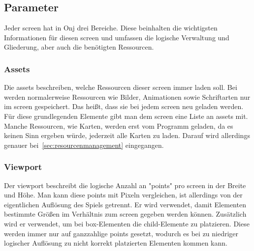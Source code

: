 \renewcommand{\kapitelautor}{Autor: Felix Zwickelstorfer}
\subsection{Parameter}\label{subsec:parameter}
\renewcommand{\kapitelautor}{Autor: Felix Zwickelstorfer}

Jeder screen hat in Onj drei Bereiche.
Diese beinhalten die wichtigsten Informationen für diesen screen und umfassen die logische Verwaltung und Gliederung, aber auch die benötigten Ressourcen.

\renewcommand{\kapitelautor}{Autor: Felix Zwickelstorfer}
\subsubsection{Assets}\label{subsubsec:assets}
\renewcommand{\kapitelautor}{Autor: Felix Zwickelstorfer}
Die assets beschreiben, welche Ressourcen dieser screen immer laden soll. 
Bei \FF werden normalerweise Ressourcen wie Bilder, Animationen sowie Schriftarten nur im screen gespeichert. 
Das heißt, dass sie bei jedem screen neu geladen werden. 
Für diese grundlegenden Elemente gibt man dem screen eine Liste an assets mit.
Manche Ressourcen, wie \zB Karten, werden erst vom Programm geladen, da es keinen Sinn ergeben würde, jederzeit alle Karten zu laden. 
Darauf wird allerdings genauer bei~\ref{sec:resourcenmanagement} eingegangen.

\renewcommand{\kapitelautor}{Autor: Felix Zwickelstorfer}
\subsubsection{Viewport}\label{subsubsec:viewport}
\renewcommand{\kapitelautor}{Autor: Felix Zwickelstorfer}
Der viewport beschreibt die logische Anzahl an "points" pro screen in der Breite und Höhe. 
Man kann diese points mit Pixeln vergleichen, ist allerdings von der eigentlichen Auflösung des Spiels getrennt.
Er wird verwendet, damit Elementen bestimmte Größen im Verhältnis zum screen gegeben werden können.
Zusätzlich wird er verwendet, um bei box-Elementen die child-Elemente zu platzieren.
Diese werden immer nur auf ganzzahlige points gesetzt, wodurch es bei zu niedriger logischer Auflösung zu nicht korrekt platzierten Elementen kommen kann.

\renewcommand{\kapitelautor}{Autor: Felix Zwickelstorfer}
